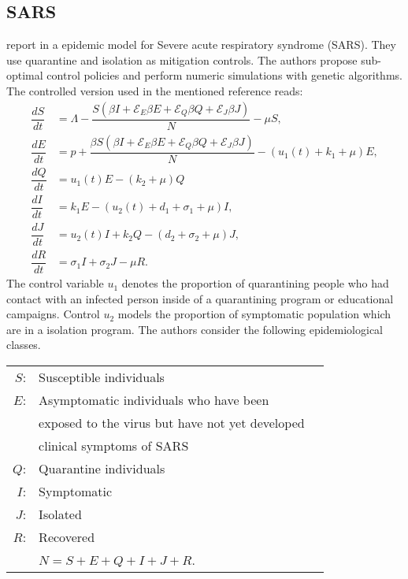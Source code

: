 
\subsection*{SARS}
\citeauthor{Yan2008} report in \cite{Yan2008} a epidemic model for
Severe acute respiratory syndrome (SARS). They use quarantine and 
isolation as mitigation controls. The authors propose sub-optimal 
control policies and perform numeric simulations with genetic 
algorithms. The controlled version used in the mentioned 
reference reads:
%
%
\begin{equation}\label{eqn:sars_model}
	\begin{aligned}
		\dfrac{dS}{dt} &=
			\Lambda 
			-\dfrac{
				S
				\left(
					\beta I 
					+ \mathcal{E}_E  \beta E
					+ \mathcal{E}_Q  \beta Q
					+ \mathcal{E}_J  \beta J
				\right)
			}{N}
			- \mu S,
		\\
		\dfrac{dE}{dt} &=
			p +
			\dfrac{
				\beta S
				\left(
					\beta I 
						+ \mathcal{E}_E \beta E
						+ \mathcal{E}_Q \beta Q
						+ \mathcal{E}_J \beta J
				\right)
			}{N}
			-(
				u_1(t) + k_1 + \mu
			)E,
		\\
		\dfrac{dQ}{dt} &=
			u_1(t) E 
			- (k_2 + \mu) Q
		\\
		\dfrac{dI}{dt} &=
			k_1 E 
			-(u_2(t) + d_1  + \sigma_1 + \mu) I,
		\\
		\dfrac{dJ}{dt} &=
			u_2(t) I 
			+ k_2 Q
			- (d_2 + \sigma_2 + \mu) J,
		\\
		\dfrac{dR}{dt} &=
			\sigma_1 I
			+\sigma_2 J
			- \mu R.
	\end{aligned}
\end{equation}
The control variable $u_1$ denotes the proportion of quarantining people 
who had contact with an infected person inside of a quarantining program or
educational campaigns. Control $u_2$ models the proportion of symptomatic 
population which are in a isolation program. The authors consider the 
following epidemiological classes.
\begin{table}[h!]
	\begin{center}
		\begin{tabular}{@{}rll@{}} 
			$S$: & Susceptible individuals 
			\\
			$E$: & Asymptomatic individuals who have been 
			\\
			   & exposed to the virus but have not yet developed 
			\\
			   & clinical symptoms of SARS 
			\\
			$Q$: & Quarantine individuals
			\\
			$I$: & Symptomatic 
			\\
			$J$: & Isolated
			\\
			$R$: & Recovered
			\\
				& $N = S + E + Q + I + J + R$.
		\end{tabular}
	\end{center}
\end{table}
